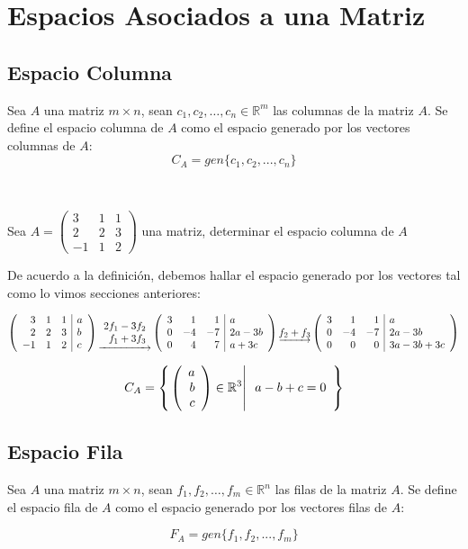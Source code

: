 \chapter{Espacios Asociados a una Matriz}

\section{Espacio Columna}
\begin{dfn}
Sea $A$ una matriz $m\times n$, sean $c_1,c_2,\ldots, c_n \in \mathbb{R}^m$ las columnas de la matriz $A$. Se define el espacio columna de $A$ como el espacio generado por los vectores columnas de $A$:
~\\
\[C_A=gen\{c_1, c_2, ..., c_n\}\]
\end{dfn}
~\\

\begin{ejemplo}
Sea $A=
\left(
\begin{array}{rrr}
3&1&1\\
2&2&3\\
-1&1&2
\end{array}
\right)$ una matriz, determinar el espacio columna de $A$
 
De acuerdo a la definición, debemos hallar el espacio generado por los vectores  tal como lo vimos secciones anteriores:

$$\reducir{{rrr|l}}{3&1&1&a\\2&2&3&b\\-1&1&2&c}
\underrightarrow{\begin{array}{r}
    2f_1 - 3f_2 \\
    f_1 + 3f_3
\end{array}}
\reducir{rrr|l}{3&1&1&a\\0&-4&-7&2a-3b\\0&4&7&a+3c}
\underrightarrow{f_2 + f_3}
\reducir{rrr|l}{3&1&1&a\\0&-4&-7&2a-3b\\0&0&0&3a-3b+3c}$$

\[C_A=\left\{ \left. \left( \begin{array}{r} a\\ b\\ c \end{array} \right)  \in \mathbb{R}^3\right| \begin{array}{r}
a-b+c=0\\
\end{array} \right\}
\]

\end{ejemplo}

\newpage
\section{Espacio Fila}
\begin{dfn}
Sea $A$ una matriz $m\times n$, sean $f_1,f_2,\ldots, f_m \in \mathbb{R}^n$ las filas de la matriz $A$. Se define el espacio fila de $A$ como el espacio generado por los vectores filas de $A$:

\[F_A=gen\{f_1, f_2, ..., f_m\}\]
\end{dfn}


